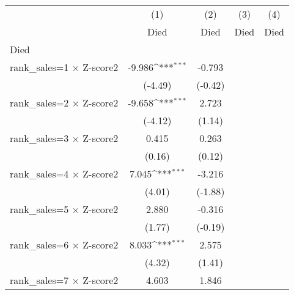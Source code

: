 {
\def\sym#1{\ifmmode^{#1}\else\(^{#1}\)\fi}
\begin{tabular}{l*{4}{c}}
\hline\hline
                    &\multicolumn{1}{c}{(1)}&\multicolumn{1}{c}{(2)}&\multicolumn{1}{c}{(3)}&\multicolumn{1}{c}{(4)}\\
                    &\multicolumn{1}{c}{Died}&\multicolumn{1}{c}{Died}&\multicolumn{1}{c}{Died}&\multicolumn{1}{c}{Died}\\
\hline
Died                &                     &                     &                     &                     \\
rank\_sales=1 $\times$ Z-score2&      -9.986\sym{***}&      -0.793         &                     &                     \\
                    &     (-4.49)         &     (-0.42)         &                     &                     \\
rank\_sales=2 $\times$ Z-score2&      -9.658\sym{***}&       2.723         &                     &                     \\
                    &     (-4.12)         &      (1.14)         &                     &                     \\
rank\_sales=3 $\times$ Z-score2&       0.415         &       0.263         &                     &                     \\
                    &      (0.16)         &      (0.12)         &                     &                     \\
rank\_sales=4 $\times$ Z-score2&       7.045\sym{***}&      -3.216         &                     &                     \\
                    &      (4.01)         &     (-1.88)         &                     &                     \\
rank\_sales=5 $\times$ Z-score2&       2.880         &      -0.316         &                     &                     \\
                    &      (1.77)         &     (-0.19)         &                     &                     \\
rank\_sales=6 $\times$ Z-score2&       8.033\sym{***}&       2.575         &                     &                     \\
                    &      (4.32)         &      (1.41)         &                     &                     \\
rank\_sales=7 $\times$ Z-score2&       4.603         &       1.846         &                     &                     \\

\end{tabular}}
